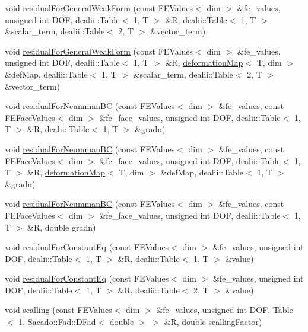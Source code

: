 \begin{DoxyCompactItemize}
\item 
void \hyperlink{class_residual_ab90bb5476a96c0e7098264562b313b7b}{residual\-For\-General\-Weak\-Form} (const F\-E\-Values$<$ dim $>$ \&fe\-\_\-values, unsigned int D\-O\-F, dealii\-::\-Table$<$ 1, T $>$ \&R, dealii\-::\-Table$<$ 1, T $>$ \&scalar\-\_\-term, dealii\-::\-Table$<$ 2, T $>$ \&vector\-\_\-term)
\item 
void \hyperlink{class_residual_a478a5fee7d75f3a16707ad5915a34d3f}{residual\-For\-General\-Weak\-Form} (const F\-E\-Values$<$ dim $>$ \&fe\-\_\-values, unsigned int D\-O\-F, dealii\-::\-Table$<$ 1, T $>$ \&R, \hyperlink{structdeformation_map}{deformation\-Map}$<$ T, dim $>$ \&def\-Map, dealii\-::\-Table$<$ 1, T $>$ \&scalar\-\_\-term, dealii\-::\-Table$<$ 2, T $>$ \&vector\-\_\-term)
\item 
void \hyperlink{class_residual_ad0e81fca1fe14909b80e709c1e93e393}{residual\-For\-Neumman\-B\-C} (const F\-E\-Values$<$ dim $>$ \&fe\-\_\-values, const F\-E\-Face\-Values$<$ dim $>$ \&fe\-\_\-face\-\_\-values, unsigned int D\-O\-F, dealii\-::\-Table$<$ 1, T $>$ \&R, dealii\-::\-Table$<$ 1, T $>$ \&gradn)
\item 
void \hyperlink{class_residual_af2aedfc68848cd35cac392aad840db05}{residual\-For\-Neumman\-B\-C} (const F\-E\-Values$<$ dim $>$ \&fe\-\_\-values, const F\-E\-Face\-Values$<$ dim $>$ \&fe\-\_\-face\-\_\-values, unsigned int D\-O\-F, dealii\-::\-Table$<$ 1, T $>$ \&R, \hyperlink{structdeformation_map}{deformation\-Map}$<$ T, dim $>$ \&def\-Map, dealii\-::\-Table$<$ 1, T $>$ \&gradn)
\item 
void \hyperlink{class_residual_a1e66cf9fc807561fc00cffb93c52d37d}{residual\-For\-Neumman\-B\-C} (const F\-E\-Values$<$ dim $>$ \&fe\-\_\-values, const F\-E\-Face\-Values$<$ dim $>$ \&fe\-\_\-face\-\_\-values, unsigned int D\-O\-F, dealii\-::\-Table$<$ 1, T $>$ \&R, double gradn)
\item 
void \hyperlink{class_residual_ab1fcf2c2ae911f4d0c73e59e60f1e6ad}{residual\-For\-Constant\-Eq} (const F\-E\-Values$<$ dim $>$ \&fe\-\_\-values, unsigned int D\-O\-F, dealii\-::\-Table$<$ 1, T $>$ \&R, dealii\-::\-Table$<$ 1, T $>$ \&value)
\item 
void \hyperlink{class_residual_a5d0f09e08ac7a6603bab9f192fd3c109}{residual\-For\-Constant\-Eq} (const F\-E\-Values$<$ dim $>$ \&fe\-\_\-values, unsigned int D\-O\-F, dealii\-::\-Table$<$ 1, T $>$ \&R, dealii\-::\-Table$<$ 2, T $>$ \&value)
\item 
void \hyperlink{class_residual_a339d8e3f5d146ad54951896c5f1e3d19}{scalling} (const F\-E\-Values$<$ dim $>$ \&fe\-\_\-values, unsigned int D\-O\-F, Table$<$ 1, Sacado\-::\-Fad\-::\-D\-Fad$<$ double $>$ $>$ \&R, double scalling\-Factor)

\end{DoxyCompactItemize}
